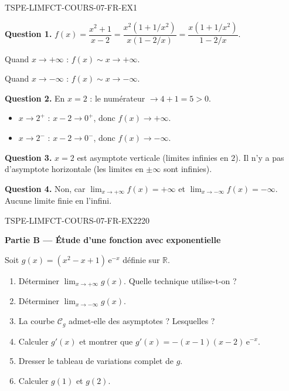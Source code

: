 \begin{corrige}{TSPE-LIMFCT-COURS-07-FR-EX1}


\textbf{Question 1.} $f(x) = \dfrac{x^2 + 1}{x - 2} = \dfrac{x^2(1 + 1/x^2)}{x(1 - 2/x)} = \dfrac{x(1 + 1/x^2)}{1 - 2/x}$.

Quand $x \to +\infty$ : $f(x) \sim x \to +\infty$.

Quand $x \to -\infty$ : $f(x) \sim x \to -\infty$.

\textbf{Question 2.} En $x = 2$ : le numérateur $\to 4 + 1 = 5 > 0$.
\begin{itemize}
  \item $x \to 2^+$ : $x - 2 \to 0^+$, donc $f(x) \to +\infty$.
  \item $x \to 2^-$ : $x - 2 \to 0^-$, donc $f(x) \to -\infty$.
\end{itemize}

\textbf{Question 3.} $x = 2$ est asymptote verticale (limites infinies en $2$). Il n'y a pas d'asymptote horizontale (les limites en $\pm\infty$ sont infinies).

\textbf{Question 4.} Non, car $\lim_{x \to +\infty} f(x) = +\infty$ et $\lim_{x \to -\infty} f(x) = -\infty$. Aucune limite finie en l'infini.

\end{corrige}

\bigskip


\begin{exercice}{TSPE-LIMFCT-COURS-07-FR-EX2}{2}{20}

\textbf{Partie B — Étude d'une fonction avec exponentielle}

Soit $g(x) = (x^2 - x + 1)\,\mathrm{e}^{-x}$ définie sur $\mathbb{R}$.

\begin{enumerate}
  \item Déterminer $\lim_{x \to +\infty} g(x)$. Quelle technique utilise-t-on ?
  \item Déterminer $\lim_{x \to -\infty} g(x)$.
  \item La courbe $\mathcal{C}_g$ admet-elle des asymptotes ? Lesquelles ?
  \item Calculer $g'(x)$ et montrer que $g'(x) = -(x-1)(x-2)\,\mathrm{e}^{-x}$.
  \item Dresser le tableau de variations complet de $g$.
  \item Calculer $g(1)$ et $g(2)$.
\end{enumerate}

\end{exercice}

